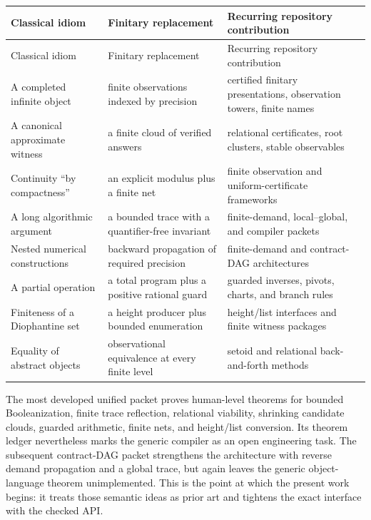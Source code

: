 \begin{longtable}{p{}p{}p{}}
\toprule
Classical idiom & Finitary replacement & Recurring repository contribution \\
\midrule
\endfirsthead
\toprule
Classical idiom & Finitary replacement & Recurring repository contribution \\
\midrule
\endhead
A completed infinite object & finite observations indexed by precision &
certified finitary presentations, observation towers, finite names \\
A canonical approximate witness & a finite cloud of verified answers &
relational certificates, root clusters, stable observables \\
Continuity ``by compactness'' & an explicit modulus plus a finite net &
finite observation and uniform-certificate frameworks \\
A long algorithmic argument & a bounded trace with a quantifier-free invariant &
finite-demand, local--global, and compiler packets \\
Nested numerical constructions & backward propagation of required precision &
finite-demand and contract-DAG architectures \\
A partial operation & a total program plus a positive rational guard &
guarded inverses, pivots, charts, and branch rules \\
Finiteness of a Diophantine set & a height producer plus bounded enumeration &
height/list interfaces and finite witness packages \\
Equality of abstract objects & observational equivalence at every finite level &
setoid and relational back-and-forth methods \\
\bottomrule
\end{longtable}

The most developed unified packet proves human-level theorems for bounded
Booleanization, finite trace reflection, relational viability, shrinking
candidate clouds, guarded arithmetic, finite nets, and height/list conversion.
Its theorem ledger nevertheless marks the generic  compiler as
an open engineering task.  The subsequent contract-DAG packet strengthens the
architecture with reverse demand propagation and a global trace, but again
leaves the generic object-language theorem unimplemented.  This is the point
at which the present work begins: it treats those semantic ideas as prior art
and tightens the exact interface with the checked  API.

